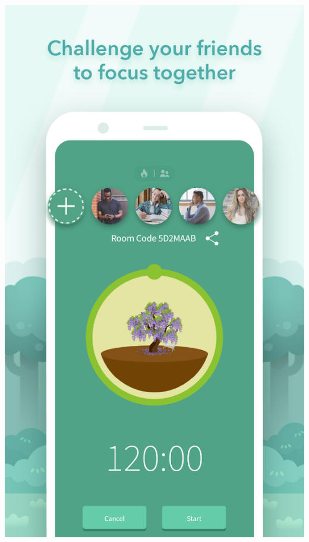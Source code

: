 \documentclass[11pt]{article}
\begin{document}
\begin{center}
\includegraphics[width=.9\linewidth]{./docs/4.png}
\end{center}
\end{document}
